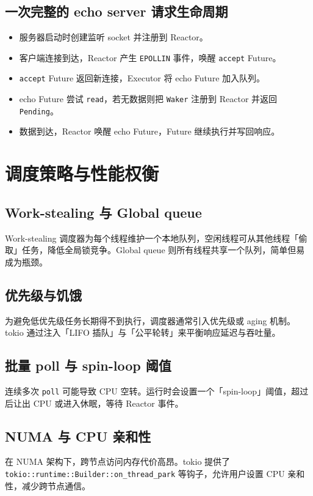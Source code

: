 \section{一次完整的 echo server 请求生命周期}
\begin{itemize}
\item 服务器启动时创建监听 socket 并注册到 Reactor。
\item 客户端连接到达，Reactor 产生 \texttt{EPOLLIN} 事件，唤醒 \texttt{accept} Future。
\item \texttt{accept} Future 返回新连接，Executor 将 echo Future 加入队列。
\item echo Future 尝试 \texttt{read}，若无数据则把 \texttt{Waker} 注册到 Reactor 并返回 \texttt{Pending}。
\item 数据到达，Reactor 唤醒 echo Future，Future 继续执行并写回响应。
\end{itemize}
\chapter{调度策略与性能权衡}
\section{Work-stealing 与 Global queue}
Work-stealing 调度器为每个线程维护一个本地队列，空闲线程可从其他线程「偷取」任务，降低全局锁竞争。Global queue 则所有线程共享一个队列，简单但易成为瓶颈。\par
\section{优先级与饥饿}
为避免低优先级任务长期得不到执行，调度器通常引入优先级或 aging 机制。tokio 通过注入「LIFO 插队」与「公平轮转」来平衡响应延迟与吞吐量。\par
\section{批量 poll 与 spin-loop 阈值}
连续多次 \texttt{poll} 可能导致 CPU 空转。运行时会设置一个「spin-loop」阈值，超过后让出 CPU 或进入休眠，等待 Reactor 事件。\par
\section{NUMA 与 CPU 亲和性}
在 NUMA 架构下，跨节点访问内存代价高昂。tokio 提供了 \texttt{tokio::runtime::Builder::on\_{}thread\_{}park} 等钩子，允许用户设置 CPU 亲和性，减少跨节点通信。\par
